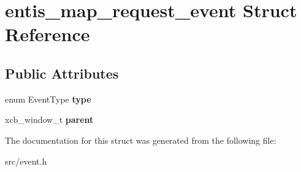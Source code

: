 \hypertarget{structentis__map__request__event}{}\section{entis\+\_\+map\+\_\+request\+\_\+event Struct Reference}
\label{structentis__map__request__event}
\subsection*{Public Attributes}
\begin{DoxyCompactItemize}
\item 
\mbox{\label{structentis__map__request__event_a4093dc4c8109300b32cdb8d2cb6b504e}} 
enum Event\+Type {\bfseries type}
\item 
\mbox{\label{structentis__map__request__event_ab2f8ed98a3b181583107daccc199141f}} 
xcb\+\_\+window\+\_\+t {\bfseries parent}
\end{DoxyCompactItemize}


The documentation for this struct was generated from the following file\+:\begin{DoxyCompactItemize}
\item 
src/event.\+h\end{DoxyCompactItemize}
